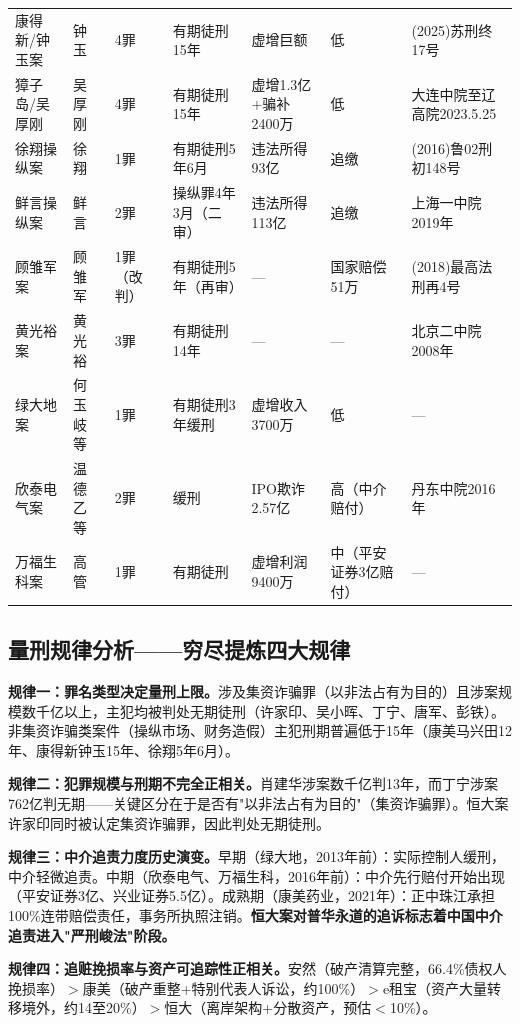 \documentclass[11pt,a4paper,oneside,openany]{article}
\begin{document}
\begin{longtable}{p{2cm}p{2cm}p{1.1cm}p{2.3cm}p{2.3cm}p{2.3cm}p{1.8cm}}
康得新/钟玉案 & 钟玉 & 4罪 & 有期徒刑15年 & 虚增巨额 & 低 & (2025)苏刑终17号 \\
獐子岛/吴厚刚 & 吴厚刚 & 4罪 & 有期徒刑15年 & 虚增1.3亿+骗补2400万 & 低 & 大连中院至辽高院2023.5.25 \\
\midrule
徐翔操纵案 & 徐翔 & 1罪 & 有期徒刑5年6月 & 违法所得93亿 & 追缴 & (2016)鲁02刑初148号 \\
鲜言操纵案 & 鲜言 & 2罪 & 操纵罪4年3月（二审） & 违法所得113亿 & 追缴 & 上海一中院2019年 \\
顾雏军案 & 顾雏军 & 1罪（改判） & 有期徒刑5年（再审） & — & 国家赔偿51万 & (2018)最高法刑再4号 \\
黄光裕案 & 黄光裕 & 3罪 & 有期徒刑14年 & — & — & 北京二中院2008年 \\
\midrule
绿大地案 & 何玉岐等 & 1罪 & 有期徒刑3年缓刑 & 虚增收入3700万 & 低 & — \\
欣泰电气案 & 温德乙等 & 2罪 & 缓刑 & IPO欺诈2.57亿 & 高（中介赔付） & 丹东中院2016年 \\
万福生科案 & 高管 & 1罪 & 有期徒刑 & 虚增利润9400万 & 中（平安证券3亿赔付） & — \\
\end{longtable}

\subsection{量刑规律分析——穷尽提炼四大规律}
\textbf{规律一：罪名类型决定量刑上限。}涉及集资诈骗罪（以非法占有为目的）且涉案规模数千亿以上，主犯均被判处无期徒刑（许家印、吴小晖、丁宁、唐军、彭铁）。非集资诈骗类案件（操纵市场、财务造假）主犯刑期普遍低于15年（康美马兴田12年、康得新钟玉15年、徐翔5年6月）。

\textbf{规律二：犯罪规模与刑期不完全正相关。}肖建华涉案数千亿判13年，而丁宁涉案762亿判无期——关键区分在于是否有"以非法占有为目的"（集资诈骗罪）。恒大案许家印同时被认定集资诈骗罪，因此判处无期徒刑。

\textbf{规律三：中介追责力度历史演变。}早期（绿大地，2013年前）：实际控制人缓刑，中介轻微追责。中期（欣泰电气、万福生科，2016年前）：中介先行赔付开始出现（平安证券3亿、兴业证券5.5亿）。成熟期（康美药业，2021年）：正中珠江承担100\%连带赔偿责任，事务所执照注销。\textbf{恒大案对普华永道的追诉标志着中国中介追责进入"严刑峻法"阶段。}

\textbf{规律四：追赃挽损率与资产可追踪性正相关。}安然（破产清算完整，66.4\%债权人挽损率）$>$康美（破产重整+特别代表人诉讼，约100\%）$>$e租宝（资产大量转移境外，约14至20\%）$>$恒大（离岸架构+分散资产，预估$<$10\%）。
\end{document}
